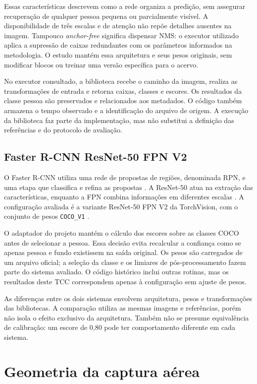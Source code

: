 Essas características descrevem como a rede organiza a predição, sem assegurar recuperação de qualquer pessoa pequena ou parcialmente visível. A disponibilidade de três escalas e de atenção não repõe detalhes ausentes na imagem. Tampouco \textit{anchor-free} significa dispensar NMS: o executor utilizado aplica a supressão de caixas redundantes com os parâmetros informados na metodologia. O estudo mantém essa arquitetura e seus pesos originais, sem modificar blocos ou treinar uma versão específica para o acervo.

No executor consultado, a biblioteca recebe o caminho da imagem, realiza as transformações de entrada e retorna caixas, classes e escores. Os resultados da classe pessoa são preservados e relacionados aos metadados. O código também armazena o tempo observado e a identificação do arquivo de origem. A execução da biblioteca faz parte da implementação, mas não substitui a definição das referências e do protocolo de avaliação.

\subsection{Faster R-CNN ResNet-50 FPN V2}
O Faster R-CNN utiliza uma rede de propostas de regiões, denominada RPN, e uma etapa que classifica e refina as propostas \cite{ren2015faster}. A ResNet-50 atua na extração das características, enquanto a FPN combina informações em diferentes escalas \cite{lin2017fpn}. A configuração avaliada é a variante ResNet-50 FPN V2 da TorchVision, com o conjunto de pesos \texttt{COCO\_V1} \cite{torchvision_models}.

O adaptador do projeto mantém o cálculo dos escores sobre as classes COCO antes de selecionar a pessoa. Essa decisão evita recalcular a confiança como se apenas pessoa e fundo existissem na saída original. Os pesos são carregados de um arquivo oficial; a seleção da classe e os limiares de pós-processamento fazem parte do sistema avaliado. O código histórico inclui outras rotinas, mas os resultados deste TCC correspondem apenas à configuração sem ajuste de pesos.

As diferenças entre os dois sistemas envolvem arquitetura, pesos e transformações das bibliotecas. A comparação utiliza as mesmas imagens e referências, porém não isola o efeito exclusivo da arquitetura. Também não se presume equivalência de calibração: um escore de 0,80 pode ter comportamento diferente em cada sistema.

\section{Geometria da captura aérea}
